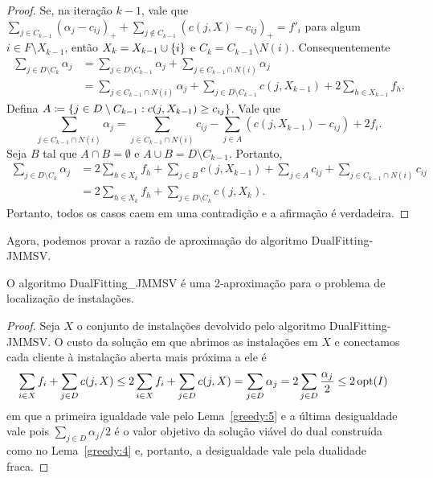 \begin{proof}
Se, na iteração $k-1$, vale que $\sum_{j \in C_{k-1}} (\alpha_j - c_{ij})_+ + \sum_{j \not \in C_{k-1}}(c(j,X) - c_{ij})_+ = f'_i$ para algum $i \in F \setminus X_{k-1}$, então $X_k = X_{k-1} \cup \{i\}$ e $C_k = C_{k-1} \setminus N(i)$. Consequentemente 
\begin{subequations}
\begin{align*}
\sum_{j \in D \setminus C_k} \alpha_j &= \sum_{j \in D\setminus C_{k-1}} \alpha_j + \sum_{j \in C_{k-1}\cap N(i)} \alpha_j \\
&= \sum_{j \in C_{k-1}\cap N(i)} \alpha_j +  \sum_{j \in D\setminus C_{k-1}}c(j,X_{k-1}) + 2 \sum_{h \in X_{k-1}} f_h.
\end{align*}
\end{subequations}
Defina $A\coloneqq \{j \in D\setminus C_{k-1}: c(j,X_{k-1}) \geq c_{ij}\}$. Vale que
\[ \sum_{j \in C_{k-1}\cap N(i)} \alpha_j = \sum_{j \in C_{k-1}\cap N(i)} c_{ij} - \sum_{j \in A} (c(j,X_{k-1}) - c_{ij}) + 2f_i. \]
Seja $B$ tal que $A \cap B = \emptyset$ e $A \cup B = D\setminus C_{k-1}$. Portanto,
\begin{subequations}
\begin{align*}
\sum_{j \in D \setminus C_k} \alpha_j &= 2\sum_{h \in X_k} f_h + \sum_{j \in B} c(j,X_{k-1}) + \sum_{j \in A} c_{ij} + \sum_{j \in C_{k-1} \cap N(i)} c_{ij}\\
&= 2 \sum_{h \in X_k} f_h + \sum_{j \in D \setminus C_k} c(j,X_k). 
\end{align*}
\end{subequations}
Portanto, todos os casos caem em uma contradição e a afirmação é verdadeira.
\end{proof}

Agora, podemos provar a razão de aproximação do algoritmo {\sc DualFitting-JMMSV}.

\begin{theorem}
O algoritmo {\sc DualFitting\_JMMSV} é uma 2-aproximação para o problema de localização de instalações.
\end{theorem} 
\begin{proof}
Seja $X$ o conjunto de instalações devolvido pelo algoritmo {\sc DualFitting-JMMSV}. O custo da solução em que abrimos as instalações em $X$ e conectamos cada cliente à instalação aberta mais próxima a ele é
\begin{subequations}
\begin{align*}
\sum_{i \in X} f_i + \sum_{j \in D}c(j,X) &\leq 2\sum_{i \in X} f_i + \sum_{j \in D}c(j,X) = \sum_{j \in D} \alpha_j = 2\sum_{j \in D} \frac{\alpha_j}{2} \leq 2\, \mathrm{opt}(I)  
\end{align*}
\end{subequations}
em que a primeira igualdade vale pelo Lema~\ref{greedy:5} e a última desigualdade vale pois $\sum_{j \in D} \alpha_j/2 $ é o valor objetivo da solução viável do dual construída como no Lema~\ref{greedy:4} e, portanto, a desigualdade vale pela dualidade fraca.
\end{proof}

